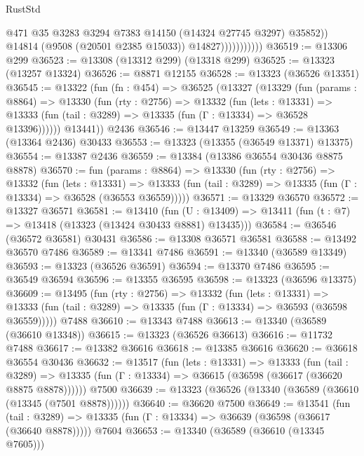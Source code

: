 \begin{lexlean}{RustStd}
\begin{coremodule}
                              @471
                              @35
                              @3283
                              @3294
                              @7383
                              @14150
                              (@14324 @27745 @3297)
                              @35852))
                          @14814
                          (@9508 (@20501 @2385 @15033))
                          @14827)))))))))))
@36519 := @13306 @299
@36523 := @13308 (@13312 @299) (@13318 @299)
@36525 := @13323 (@13257 @13324)
@36526 := @8871 @12155
@36528 := @13323 (@36526 @13351)
@36545 := @13322
    (fun (fn : @454) =>
    @36525
      (@13327
        (@13329
          (fun (params : @8864) =>
          @13330
            (fun (rty : @2756) =>
            @13332
              (fun (lets : @13331) =>
              @13333 (fun (tail : @3289) => @13335 (fun (Γ : @13334) => @36528 @13396))))))
        @13441))
    @2436
@36546 := @13447 @13259
@36549 := @13363 (@13364 @2436) @30433
@36553 := @13323 (@13355 (@36549 @13371) @13375)
@36554 := @13387 @2436
@36559 := @13384 (@13386 @36554 @30436 @8875 @8878)
@36570 := fun (params : @8864) =>
  @13330
    (fun (rty : @2756) =>
    @13332
      (fun (lets : @13331) =>
      @13333 (fun (tail : @3289) => @13335 (fun (Γ : @13334) => @36528 (@36553 @36559)))))
@36571 := @13329 @36570
@36572 := @13327 @36571
@36581 := @13410
    (fun (U : @13409) => @13411 (fun (t : @7) => @13418 (@13323 (@13424 @30433 @8881) @13435)))
@36584 := @36546 (@36572 @36581) @30431
@36586 := @13308 @36571 @36581
@36588 := @13492 @36570 @7486
@36589 := @13341 @7486
@36591 := @13340 (@36589 @13349)
@36593 := @13323 (@36526 @36591)
@36594 := @13370 @7486
@36595 := @36549 @36594
@36596 := @13355 @36595
@36598 := @13323 (@36596 @13375)
@36609 := @13495
    (fun (rty : @2756) =>
    @13332
      (fun (lets : @13331) =>
      @13333 (fun (tail : @3289) => @13335 (fun (Γ : @13334) => @36593 (@36598 @36559)))))
    @7488
@36610 := @13343 @7488
@36613 := @13340 (@36589 (@36610 @13348))
@36615 := @13323 (@36526 @36613)
@36616 := @11732 @7488
@36617 := @13382 @36616
@36618 := @13385 @36616
@36620 := @36618 @36554 @30436
@36632 := @13517
    (fun (lets : @13331) =>
    @13333
      (fun (tail : @3289) =>
      @13335 (fun (Γ : @13334) => @36615 (@36598 (@36617 (@36620 @8875 @8878))))))
    @7500
@36639 := @13323 (@36526 (@13340 (@36589 (@36610 (@13345 (@7501 @8878))))))
@36640 := @36620 @7500
@36649 := @13541
    (fun (tail : @3289) => @13335 (fun (Γ : @13334) => @36639 (@36598 (@36617 (@36640 @8878)))))
    @7604
@36653 := @13340 (@36589 (@36610 (@13345 @7605)))

\end{coremodule}
\end{lexlean}

